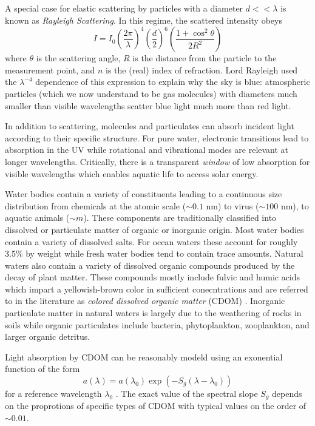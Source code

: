 A special case for elastic scattering by particles with a diameter $d <<
\lambda$ is known as \textit{Rayleigh Scattering}. In this regime, the scattered
intensity obeys
\begin{equation}
  I = I_0  \left( \frac{2\pi}{\lambda} \right)^4 \left( \frac{d}{2} \right)^6 \left( \frac{1 + \cos^2\theta}{2R^2} \right)
\end{equation}
where $\theta$ is the scattering angle, $R$ is the distance from the particle to
the measurement point, and $n$ is the (real) index of refraction. Lord Rayleigh
used the $\lambda^{-4}$ dependence of this expression to explain why the sky is
blue: atmospheric particles (which we now understand to be gas molecules) with
diameters much smaller than visible wavelengths scatter blue light
much more than red light.

In addition to scattering, molecules and particulates can absorb incident light
according to their specific structure. For pure water, electronic transitions
lead to absorption in the UV while rotational and vibrational modes are relevant
at longer wavelengths. Critically, there is a transparent \textit{window} of low
absorption for visible wavelengths which enables aquatic life to access solar
energy.

Water bodies contain a variety of constituents leading to a continuous size
distribution from chemicals at the atomic scale ($\sim$$0.1$ nm) to virus
($\sim$$100$ nm), to aquatic animals ($\sim$$m$). These components are traditionally
classified into dissolved or particulate matter of organic or inorganic origin.
Most water bodies contain a variety of dissolved salts. For ocean waters these
account for roughly 3.5\% by weight while fresh water bodies tend to contain
trace amounts. Natural waters also contain a variety of dissolved organic
compounds produced by the decay of plant matter. These compounds mostly include
fulvic and humic acids which impart a yellowish-brown color in sufficient
conecntrations and are referred to in the literature as \textit{colored
  dissolved organic matter} (CDOM) \cite{cdom-acids}. Inorganic particulate
matter in natural waters is largely due to the weathering of rocks in soils
while organic particulates include bacteria, phytoplankton, zooplankton, and
larger organic detritus.

Light absorption by CDOM can be reasonably modeld using an exonential function
of the form
\begin{equation}
  a(\lambda) = a(\lambda_0)\exp(-S_g(\lambda - \lambda_0))
\end{equation}
for a reference wavelength $\lambda_0$ \cite{aurin2018remote}. The exact
value of the spectral slope $S_g$ depends on the proprotions of specific types
of CDOM with typical values on the order of $\sim$$0.01$.

